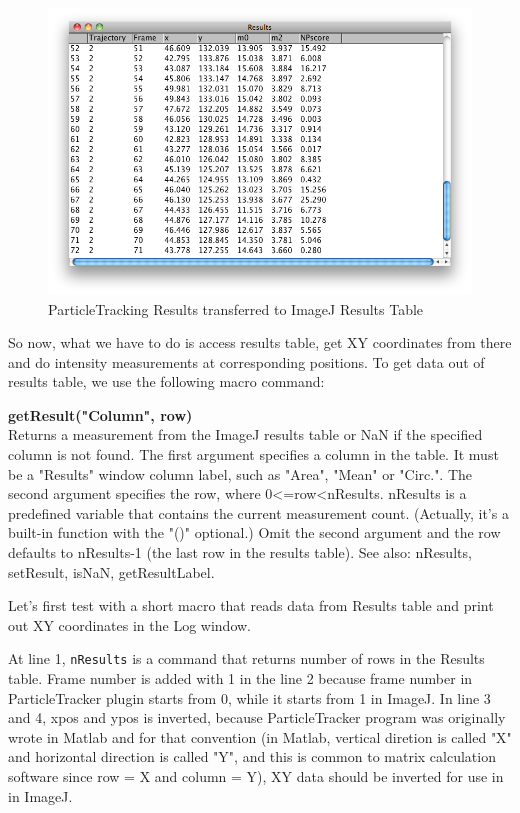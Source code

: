 \documentclass[11pt,a4paper,oneside]{report}
\newenvironment{indentCom}%
{\begin{list}{}%
         {\setlength{\leftmargin}{1em}}%
         \item[]%
}
{\end{list}}
\newcommand{\ilcom}[1]{\texttt{\small#1}}
\begin{document}
\begin{figure}[htbp]
\begin{center}
\includegraphics[scale=0.4]{fig/fig253_TrackingResultsInResultsTabel.png}
\caption{ParticleTracking Results transferred to ImageJ Results Table}
\label{fig:particletrackingTransferred}
\end{center}
\end{figure}

So now, what we have to do is access results table, get XY coordinates from there and do intensity measurements at corresponding positions. To get data out of results table, we use the following macro command:
\begin{indentCom}
\textbf{getResult("Column", row)}\\
Returns a measurement from the ImageJ results table or NaN if the specified column is not found. The first argument specifies a column in the table. It must be a "Results" window column label, such as "Area", "Mean" or "Circ.". The second argument specifies the row, where 0<=row<nResults. nResults is a predefined variable that contains the current measurement count. (Actually, it's a built-in function with the "()" optional.) Omit the second argument and the row defaults to nResults-1 (the last row in the results table). See also: nResults, setResult, isNaN, getResultLabel.
\end{indentCom}
Let's first test with a short macro that reads data from Results table and print out XY coordinates in the Log window. 



At line 1, \ilcom{nResults} is a command that returns number of rows in the Results table. Frame number is added with 1 in the line 2  because frame number in ParticleTracker plugin starts from 0, while it starts from 1 in ImageJ. In line 3 and 4, xpos and ypos is inverted, because ParticleTracker program was originally wrote in Matlab and for that convention (in Matlab, vertical diretion is called "X" and horizontal direction is called "Y", and this is common to matrix calculation software since row = X and column = Y), XY data should be inverted for use in in ImageJ. 
\end{document}
